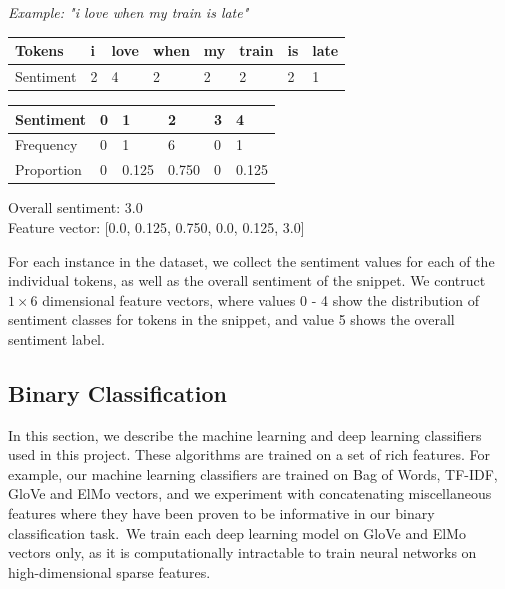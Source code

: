 \documentclass[12pt,a4paper]{article}
\begin{document}
\hspace{-15pt}\begin{minipage}{0.55\textwidth}
	\textit{Example: "i love when my train is late"}\vspace{-15pt}
	\begin{center}	
		\begin{tabular}{|m{1.8cm}||m{0.4cm}m{0.6cm}m{0.75cm}m{0.4cm}m{0.7cm}m{0.2cm}m{0.6cm}|}
			\hline 
			\textbf{Tokens} & \textbf{i} & \textbf{love} & \textbf{when} & \textbf{my} & \textbf{train} & \textbf{is} & \textbf{late}\\ 
			\hline 
			Sentiment & 2 & 4 & 2 & 2 & 2 & 2 & 1\\ 
			\hline 
		\end{tabular}
		\vspace{5pt}
		
		\begin{tabular}{|p{1.8cm}||p{0.9cm}|p{0.9cm}|p{0.9cm}|p{0.9cm}|p{0.9cm}|} 
			\hline 
			\textbf{Sentiment} & \textbf{0} & \textbf{1} & \textbf{2} & \textbf{3} & \textbf{4}\\ 
			\hline 
			Frequency & 0 & 1 & 6 & 0 & 1\\ 
			Proportion & 0 & 0.125 & 0.750 & 0 & 0.125\\
			\hline  
		\end{tabular}
	\end{center}
	Overall sentiment: 3.0\\
	Feature vector: [0.0, 0.125, 0.750, 0.0, 0.125, 3.0]\\
\end{minipage}
\hspace{15pt}\begin{minipage}{0.4\textwidth}
	\vspace{-5pt}
	For each instance in the dataset, we collect the sentiment values for each of the individual tokens, as well as the overall sentiment of the snippet. We contruct $ 1 \times 6 $ dimensional feature vectors, where values 0 - 4 show the distribution of sentiment classes for tokens in the snippet, and value 5 shows the overall sentiment label.\\
\end{minipage}



\subsection{Binary Classification}\vspace{-5pt}
\noindent In this section, we describe the machine learning and deep learning classifiers used in this project. These algorithms are trained on a set of rich features. For example, our machine learning classifiers are trained on Bag of Words, TF-IDF, GloVe and ElMo vectors, and we experiment with concatenating miscellaneous features where they have been proven to be informative in our binary classification task.\ We train each deep learning model on GloVe and ElMo vectors only, as it is computationally intractable to train neural networks on high-dimensional sparse features.\vspace{-5pt}
\end{document}

